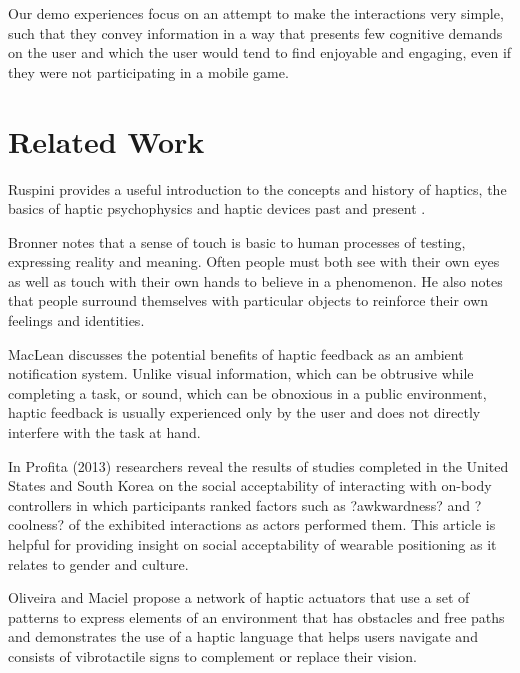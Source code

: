 \documentclass{chi-ext}
\begin{document}
Our demo experiences focus on an attempt to make the interactions very simple, such that they convey information in a way that presents few cognitive demands on the user and which the user would tend to find enjoyable and engaging, even if they were not participating in a mobile game. 

\section{Related Work}

Ruspini provides a useful introduction to the concepts and history of haptics, the basics of haptic psychophysics and haptic devices past and present \cite{ruspini1999haptics}.

Bronner notes that a sense of touch is basic to human processes of testing, expressing reality and meaning. Often people must both see with their own eyes as well as touch with their own hands to believe in a phenomenon\cite{bronner1982haptic}. He also notes that people surround themselves with particular objects to reinforce their own feelings and identities. 

MacLean \cite{maclean2009putting} discusses the potential benefits of haptic feedback as an ambient notification system. Unlike visual information, which can be obtrusive while completing a task, or sound, which can be obnoxious in a public environment, haptic feedback is usually experienced only by the user and does not directly interfere with the task at hand. 

In Profita (2013) \cite{profita2013don} researchers reveal the results of studies completed in the United States and South Korea on the social acceptability of interacting with on-body controllers in which participants  ranked factors such as ?awkwardness? and ?coolness? of the exhibited interactions as actors performed them. This article is helpful for providing insight on social acceptability of wearable positioning as it relates to gender and culture.

Oliveira and Maciel propose a network of haptic actuators that use a set of patterns to express elements of an environment that has obstacles and free paths and demonstrates the use of a haptic language that helps users navigate and consists of vibrotactile signs to complement or replace their vision. \cite{Jesus-Oliveira:2013aa}
\end{document}
